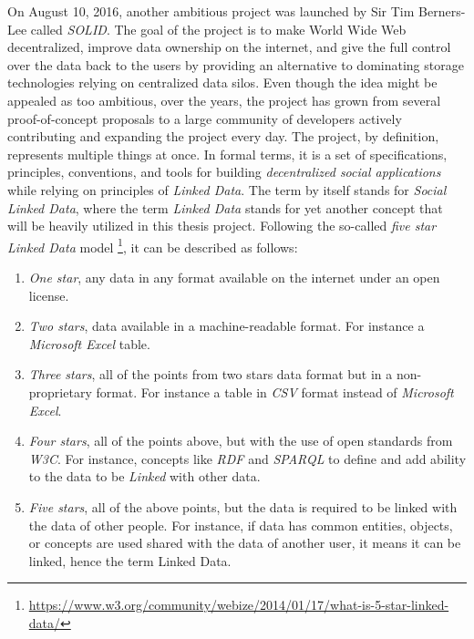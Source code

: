 On August 10, 2016, another ambitious project was launched by Sir Tim Berners-Lee called \textit{SOLID}. The goal of the project is to make World Wide Web decentralized, improve data ownership on the internet, and give the full control over the data back to the users by providing an alternative to dominating storage technologies relying on centralized data silos. Even though the idea might be appealed as too ambitious, over the years, the project has grown from several proof-of-concept proposals to a large community of developers actively contributing and expanding the project every day. The \solid{} project, by definition, represents multiple things at once. In formal terms, it is a set of specifications, principles, conventions, and tools for building \textit{decentralized social applications} while relying on principles of \textit{Linked Data}. The term \solid{} by itself stands for \textit{Social Linked Data}, where the term \textit{Linked Data} stands for yet another concept that will be heavily utilized in this thesis project. Following the so-called \textit{five star Linked Data} model \footnote{\url{https://www.w3.org/community/webize/2014/01/17/what-is-5-star-linked-data/}}, it can be described as follows:
\begin{enumerate}
    \item \textit{One star}, any data in any format available on the internet under an open license.
    \item \textit{Two stars}, data available in a machine-readable format. For instance a \textit{Microsoft Excel} table.
    \item \textit{Three stars}, all of the points from two stars data format but in a non-proprietary format. For instance a table in \textit{CSV} format instead of \textit{Microsoft Excel}.
    \item \textit{Four stars}, all of the points above, but with the use of open standards from \textit{W3C}. For instance, concepts like \textit{RDF} and \textit{SPARQL} to define and add ability to the data to be \textit{Linked} with other data.
    \item \textit{Five stars}, all of the above points, but the data is required to be linked with the data of other people. For instance, if data has common entities, objects, or concepts are used shared with the data of another user, it means it can be linked, hence the term Linked Data.   
\end{enumerate}

